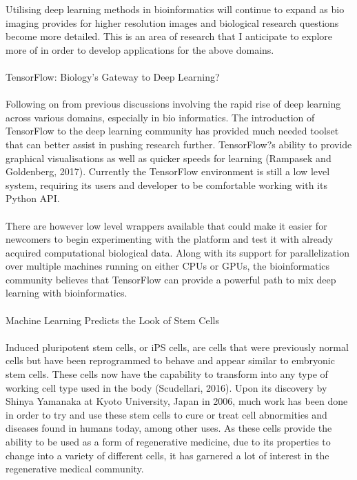 {Utilising deep learning methods in bioinformatics will continue to expand as bio imaging provides for higher resolution images and biological research questions become more detailed. This is an area of research that I anticipate to explore more of in order to develop applications for the above domains. \\ \\
TensorFlow: Biology's Gateway to Deep Learning? \\ \\
 Following on from previous discussions involving the rapid rise of deep learning across various domains, especially in bio informatics. The introduction of TensorFlow to the deep learning community has provided much needed toolset that can better assist in pushing research further. TensorFlow?s ability to provide graphical visualisations as well as quicker speeds for learning (Rampasek and Goldenberg, 2017). Currently the TensorFlow environment is still a low level system, requiring its users and developer to be comfortable working with its Python API. \\ \\
 There are however low level wrappers available that could make it easier for newcomers to begin experimenting with the platform and test it with already acquired computational biological data. Along with its support for parallelization over multiple machines running on either CPUs or GPUs, the bioinformatics community believes that TensorFlow can provide a powerful path to mix deep learning with bioinformatics. \\ \\ 
Machine Learning Predicts the Look of Stem Cells \\ \\
Induced pluripotent stem cells, or iPS cells, are cells that were previously normal cells but have been reprogrammed to behave and appear similar to embryonic stem cells. These cells now have the capability to transform into any type of working cell type used in the body (Scudellari, 2016). Upon its discovery by Shinya Yamanaka at Kyoto University, Japan in 2006, much work has been done in order to try and use these stem cells to cure or treat cell abnormities and diseases found in humans today, among other uses. As these cells provide the ability to be used as a form of regenerative medicine, due to its properties to change into a variety of different cells, it has garnered a lot of interest in the regenerative medical community. \\ \\
}
